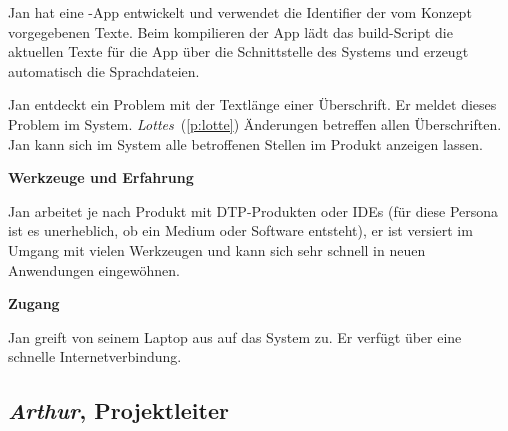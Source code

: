 \begin{multicols}{2}
Jan hat eine -App entwickelt und verwendet die Identifier der vom Konzept vorgegebenen Texte. Beim kompilieren der App lädt das build-Script die aktuellen Texte für die App über die Schnittstelle des Systems und erzeugt automatisch die Sprachdateien.

Jan entdeckt ein Problem mit der Textlänge einer Überschrift. Er meldet dieses Problem im System. \emph{Lottes}~(\ref{p:lotte}) Änderungen betreffen allen Überschriften. Jan kann sich im System alle betroffenen Stellen im Produkt anzeigen lassen.

\textbf{Werkzeuge und Erfahrung}

Jan arbeitet je nach Produkt mit DTP-Produkten oder IDEs (für diese Persona ist es unerheblich, ob ein Medium oder Software entsteht), er ist versiert im Umgang mit vielen Werkzeugen und kann sich sehr schnell in neuen Anwendungen eingewöhnen.

\textbf{Zugang}

Jan greift von seinem Laptop aus auf das System zu. Er verfügt über eine schnelle Internetverbindung.

\end{multicols}

\pagebreak

\subsection{\emph{Arthur}, Projektleiter}\label{p:arthur}

